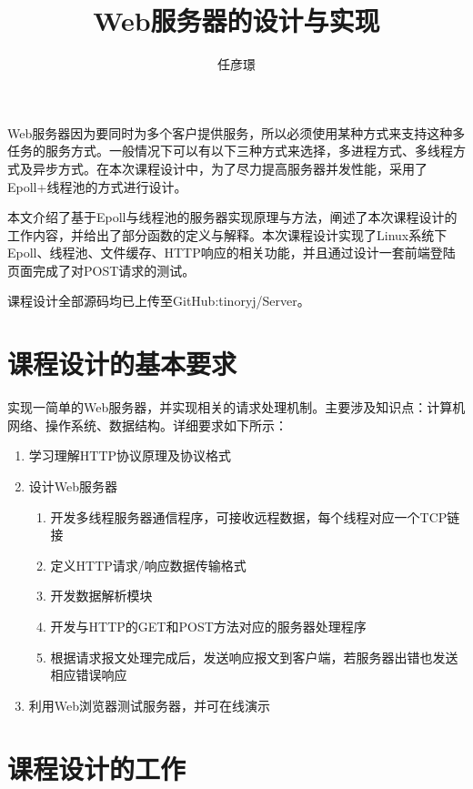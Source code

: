 \documentclass[bachelor]{thesis-uestc}
\title{Web服务器的设计与实现}
\author{任彦璟}
\begin{document}
\begin{chineseabstract}

Web服务器因为要同时为多个客户提供服务，所以必须使用某种方式来支持这种多任务的服务方式。一般情况下可以有以下三种方式来选择，多进程方式、多线程方式及异步方式。在本次课程设计中，为了尽力提高服务器并发性能，采用了Epoll+线程池的方式进行设计。

本文介绍了基于Epoll与线程池的服务器实现原理与方法，阐述了本次课程设计的工作内容，并给出了部分函数的定义与解释。本次课程设计实现了Linux系统下Epoll、线程池、文件缓存、HTTP响应的相关功能，并且通过设计一套前端登陆页面完成了对POST请求的测试。

课程设计全部源码均已上传至GitHub:tinoryj/Server。


\end{chineseabstract}

\thesistableofcontents

\thesischapterexordium

\section{课程设计的基本要求}

实现一简单的Web服务器，并实现相关的请求处理机制。主要涉及知识点：计算机网络、操作系统、数据结构。详细要求如下所示：

\begin{enumerate}
	\item 学习理解HTTP协议原理及协议格式
	\item 设计Web服务器
	\begin{enumerate}
		\item 开发多线程服务器通信程序，可接收远程数据，每个线程对应一个TCP链接
		\item 定义HTTP请求/响应数据传输格式
		\item 开发数据解析模块
		\item 开发与HTTP的GET和POST方法对应的服务器处理程序
		\item 根据请求报文处理完成后，发送响应报文到客户端，若服务器出错也发送相应错误响应
	\end{enumerate}
	\item 利用Web浏览器测试服务器，并可在线演示

\end{enumerate}

\section{课程设计的工作}
\end{document}
